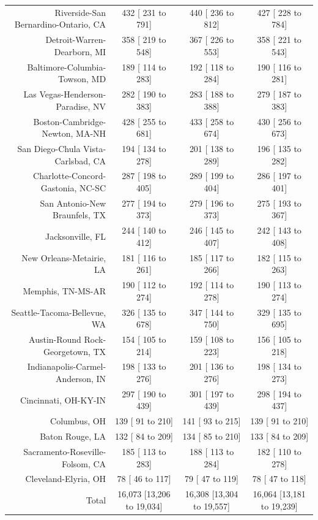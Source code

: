 \documentclass{article}
\begin{document}
\begin{table}[H]
\begin{tabular}{|r|c|c|c|}
		Riverside-San Bernardino-Ontario, CA &    432 [   231 to    791] &    440 [   236 to    812] &    427 [   228 to    784]\\
		Detroit-Warren-Dearborn, MI &    358 [   219 to    548] &    367 [   226 to    553] &    358 [   221 to    543]\\
		Baltimore-Columbia-Towson, MD &    189 [   114 to    283] &    192 [   118 to    284] &    190 [   116 to    281]\\
		Las Vegas-Henderson-Paradise, NV &    282 [   190 to    383] &    283 [   188 to    388] &    279 [   187 to    383]\\
		Boston-Cambridge-Newton, MA-NH &    428 [   255 to    681] &    433 [   258 to    674] &    430 [   256 to    673]\\
		San Diego-Chula Vista-Carlsbad, CA &    194 [   134 to    278] &    201 [   138 to    289] &    196 [   135 to    282]\\
		Charlotte-Concord-Gastonia, NC-SC &    287 [   198 to    405] &    289 [   199 to    404] &    286 [   197 to    401]\\
		San Antonio-New Braunfels, TX &    277 [   194 to    373] &    279 [   196 to    373] &    275 [   193 to    367]\\
		Jacksonville, FL &    244 [   140 to    412] &    246 [   145 to    407] &    242 [   143 to    408]\\
		New Orleans-Metairie, LA &    181 [   116 to    261] &    185 [   117 to    266] &    182 [   115 to    263]\\
		Memphis, TN-MS-AR &    190 [   112 to    274] &    192 [   114 to    278] &    190 [   113 to    274]\\
		Seattle-Tacoma-Bellevue, WA &    326 [   135 to    678] &    347 [   144 to    750] &    329 [   135 to    695]\\
		Austin-Round Rock-Georgetown, TX &    154 [   105 to    214] &    159 [   108 to    223] &    156 [   105 to    218]\\
		Indianapolis-Carmel-Anderson, IN &    198 [   133 to    276] &    201 [   136 to    276] &    198 [   134 to    273]\\
		Cincinnati, OH-KY-IN &    297 [   190 to    439] &    301 [   197 to    439] &    298 [   194 to    437]\\
		Columbus, OH &    139 [    91 to    210] &    141 [    93 to    215] &    139 [    91 to    210]\\
		Baton Rouge, LA &    132 [    84 to    209] &    134 [    85 to    210] &    133 [    84 to    209]\\
		Sacramento-Roseville-Folsom, CA &    185 [   113 to    283] &    188 [   113 to    284] &    182 [   110 to    278]\\
		Cleveland-Elyria, OH &     78 [    46 to    117] &     79 [    47 to    119] &     78 [    47 to    118]\\
		\hline
		Total & 16,073 [13,206 to 19,034] & 16,308 [13,304 to 19,557] & 16,064 [13,181 to 19,239]\\
		\hline
	\end{tabular}
\end{table}
\end{document}
